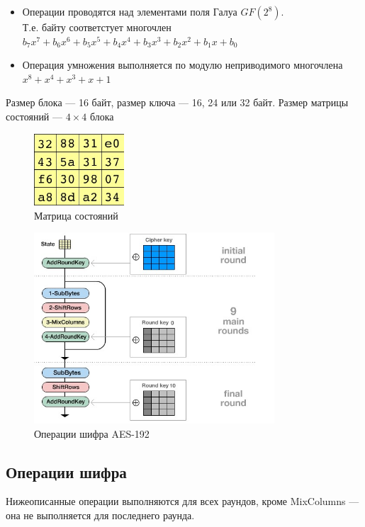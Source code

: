 \documentclass[a4paper, 14pt]{extarticle}
\begin{document}
\FloatBarrier{}
\begin{itemize}
    \item Операции проводятся над элементами поля Галуа $GF(2^8)$.\\
    Т.е. байту соответстует многочлен $b_7 x^7 + b_6 x^6 + b_5 x^5 + b_4 x^4 + b_3 x^3 + b_2 x^2 + b_1 x + b_0$
    \item Операция умножения выполняется по модулю неприводимого многочлена $ x^8 + x^4 + x^3 + x + 1 $\\
\end{itemize}
Размер блока --- 16 байт, размер ключа --- 16, 24 или 32 байт. Размер матрицы состояний --- $4\times4$ блока

\begin{figure}[h]
    \centering
    \includegraphics[width=0.3\textwidth]{img/S002.jpg}
    \caption{Матрица состояний}
\end{figure}

\begin{figure}[h]
    \centering
    \includegraphics[width=0.8\textwidth]{img/S003.jpg}
    \caption{Операции шифра AES-192}
\end{figure}

\FloatBarrier{}
\subsection{Операции шифра}
Нижеописанные операции выполняются для всех раундов, кроме MixColumns --- она не выполняется для последнего раунда.
\end{document}
